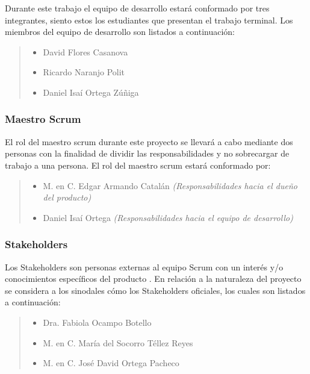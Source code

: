  Durante este trabajo el equipo de desarrollo estará conformado por tres integrantes,
 siento estos los estudiantes que presentan el trabajo terminal. Los miembros del
 equipo de desarrollo son listados a continuación:

    \begin{quote}
    \begin{itemize}
        \item David Flores Casanova
        \item Ricardo Naranjo Polit
        \item Daniel Isaí Ortega Zúñiga
    \end{itemize}
    \end{quote}

\subsubsection{Maestro Scrum}

 El rol del maestro scrum durante este proyecto se llevará a cabo mediante dos
 personas con la finalidad de dividir las responsabilidades y no sobrecargar de
 trabajo a una persona. El rol del maestro scrum estará conformado por:

    \begin{quote}
    \begin{itemize}
        \item M. en C. Edgar Armando Catalán 
                       {\it(Responsabilidades hacia el dueño del producto)}
        \item Daniel Isaí Ortega
                       {\it(Responsabilidades hacia el equipo de desarrollo)}
    \end{itemize}
    \end{quote}


\subsubsection{Stakeholders}

 Los Stakeholders son personas externas al equipo Scrum con un interés y/o
 conocimientos específicos del producto \cite{ScrumGlosary}. En relación a la
 naturaleza del proyecto se considera a los sinodales cómo los Stakeholders oficiales,
 los cuales son listados a continuación:

    \begin{quote}
    \begin{itemize}
        \item Dra. Fabiola Ocampo Botello
        \item M. en C. María del Socorro Téllez Reyes
        \item M. en C. José David Ortega Pacheco
    \end{itemize}
    \end{quote}

